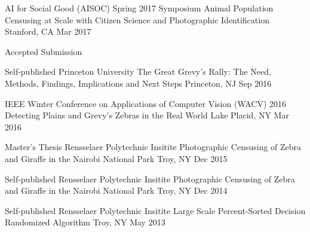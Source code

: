 

\begin{cventries}

  \cventry
    {AI for Social Good (AISOC) Spring 2017 Symposium} %
    {Animal Population Censusing at Scale with Citizen Science and Photographic Identification} %
    {Stanford, CA} %
    {Mar 2017} %
    {
     \begin{cvitems}
        \item {Accepted Submission}
      \end{cvitems}
    }

  \cventryshort
    {Self-published \dotSep Princeton University} %
    {The Great Grevy’s Rally: The Need, Methods, Findings, Implications and Next Steps} %
    {Princeton, NJ} %
    {Sep 2016} %

  \cventryshort
    {IEEE Winter Conference on Applications of Computer Vision (WACV) 2016} %
    {Detecting Plains and Grevy's Zebras in the Real World} %
    {Lake Placid, NY} %
    {Mar 2016} %

  \cventryshort
    {Master's Thesis \dotSep Rensselaer Polytechnic Insitite} %
    {Photographic Censusing of Zebra and Giraffe in the Nairobi National Park} %
    {Troy, NY} %
    {Dec 2015} %

  \cventryshort
    {Self-published \dotSep Rensselaer Polytechnic Insitite} %
    {Photographic Censusing of Zebra and Giraffe in the Nairobi National Park} %
    {Troy, NY} %
    {Dec 2014} %

  \cventryshort
    {Self-published \dotSep Rensselaer Polytechnic Insitite} %
    {Large Scale Percent-Sorted Decision Randomized Algorithm} %
    {Troy, NY} %
    {May 2013} %

\end{cventries}
